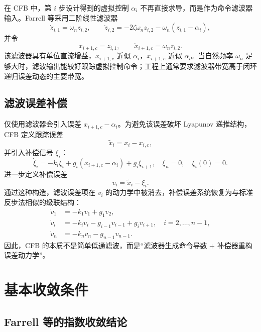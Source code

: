\documentclass[UTF8,a4paper,11pt,fontset=fandol]{ctexart}
\begin{document}
在 CFB 中，第 $i$ 步设计得到的虚拟控制 $\alpha_i$ 不再直接求导，而是作为命令滤波器输入。Farrell 等采用二阶线性滤波器
\begin{equation}
  \dot{z}_{i,1}=\omega_n z_{i,2},\qquad
  \dot{z}_{i,2}=-2\zeta\omega_n z_{i,2}-\omega_n(z_{i,1}-\alpha_i),
\end{equation}
并令
\begin{equation}
  x_{i+1,c}=z_{i,1},\qquad \dot{x}_{i+1,c}=\omega_n z_{i,2}.
\end{equation}
该滤波器具有单位直流增益，$x_{i+1,c}$ 近似 $\alpha_i$，$\dot{x}_{i+1,c}$ 近似 $\dot{\alpha}_i$。当自然频率 $\omega_n$ 足够大时，滤波输出能较好跟踪虚拟控制命令；工程上通常要求滤波器带宽高于闭环递归误差动态的主要带宽。

\subsection{滤波误差补偿}

仅使用滤波器会引入误差 $x_{i+1,c}-\alpha_i$。为避免该误差破坏 Lyapunov 递推结构，CFB 定义跟踪误差
\begin{equation}
  \tilde{x}_i=x_i-x_{i,c},
\end{equation}
并引入补偿信号 $\xi_i$：
\begin{equation}
  \dot{\xi}_i=-k_i\xi_i+g_i(x_{i+1,c}-\alpha_i)+g_i\xi_{i+1},\quad
  \xi_n=0,\quad \xi_i(0)=0 .
\end{equation}
进一步定义补偿误差
\begin{equation}
  v_i=\tilde{x}_i-\xi_i .
\end{equation}
通过这种构造，滤波误差项在 $v_i$ 的动力学中被消去，补偿误差系统恢复为与标准反步法相似的级联结构：
\begin{align}
  \dot{v}_1&=-k_1 v_1+g_1v_2,\\
  \dot{v}_i&=-k_i v_i-g_{i-1}v_{i-1}+g_iv_{i+1},\quad i=2,\ldots,n-1,\\
  \dot{v}_n&=-k_nv_n-g_{n-1}v_{n-1}.
\end{align}
因此，CFB 的本质不是简单低通滤波，而是``滤波器生成命令导数 + 补偿器重构误差动力学''。

\section{基本收敛条件}

\subsection{Farrell 等的指数收敛结论}
\end{document}
